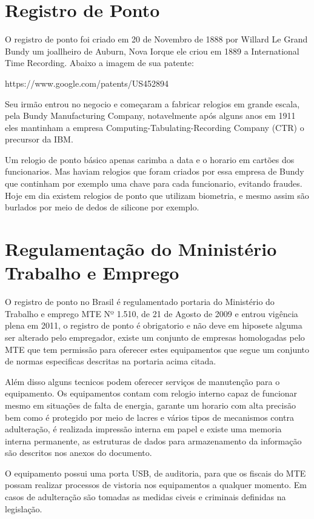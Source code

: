 \documentclass[12pt,openright,twoside,a4paper,english, brazil]{abntex2} %
\begin{document}
\section{Registro de Ponto}

O registro de ponto foi criado em 20 de Novembro de 1888 por Willard Le Grand Bundy um joallheiro de Auburn, Nova Iorque ele criou em 1889 a International Time Recording. Abaixo a imagem de sua patente:

https://www.google.com/patents/US452894

Seu irmão entrou no negocio e começaram a fabricar relogios em grande escala, pela Bundy Manufacturing Company, notavelmente após alguns anos em 1911 eles mantinham a empresa Computing-Tabulating-Recording Company (CTR) o precursor da IBM.

Um relogio de ponto básico apenas carimba a data e o horario em cartões dos funcionarios. Mas haviam relogios que foram criados por essa empresa de Bundy que continham por exemplo uma chave para cada funcionario, evitando fraudes. Hoje em dia existem relogios de ponto que utilizam biometria, e mesmo assim são burlados por meio de dedos de silicone por exemplo.

\section{Regulamentação do Mninistério Trabalho e Emprego}

O registro de ponto no Brasil é regulamentado portaria do Ministério do Trabalho e emprego MTE Nº 1.510, de 21 de Agosto de 2009 e entrou vigência plena em 2011, o registro de ponto é obrigatorio e não deve em hiposete alguma ser alterado pelo empregador, existe um conjunto de empresas homologadas pelo MTE que tem permissão para oferecer estes equipamentos que segue um conjunto de normas especificas descritas na portaria acima citada.

Além disso alguns tecnicos podem oferecer serviços de manutenção para o equipamento. Os equipamentos contam com relogio interno capaz de funcionar mesmo em situações de falta de energia, garante um horario com alta precisão bem como é protegido por meio de lacres e vários tipos de mecanismos contra adulteração, é realizada impressão interna em papel e existe uma memoria interna permanente, as estruturas de dados para armazenamento da informação são descritos nos anexos do documento.

O equipamento possui uma porta USB, de auditoria, para que os fiscais do MTE possam realizar processos de vistoria nos equipamentos a qualquer momento. Em casos de adulteração são tomadas as medidas civeis e criminais definidas na legislação. 
\end{document}
